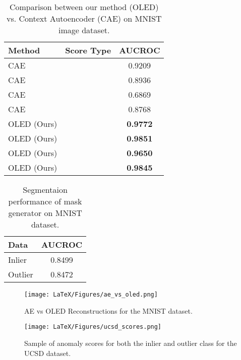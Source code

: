 \documentclass[10pt,twocolumn,letterpaper]{article}
\begin{document}
\begin{table}
\begin{center}
 \begin{tabular}{|l|l|c|} 
 \hline
Method & Score Type & AUCROC \\ [0.5ex] 
 \hline\hline
 CAE &   & 0.9209  \\ 
 CAE &   & 0.8936 \\
 CAE &   & 0.6869 \\
 CAE &   &  0.8768 \\
 \hline
 OLED (Ours) &   & \textbf{0.9772}  \\ 
 OLED (Ours) &   & \textbf{0.9851} \\
 OLED (Ours) &   & \textbf{0.9650} \\
 OLED (Ours) &   &  \textbf{0.9845} \\
 \hline
\end{tabular}
\end{center}
\caption{Comparison between our method (OLED) vs. Context Autoencoder (CAE) on MNIST image dataset.}
\label{oled_vs_cae}
\end{table}




\begin{table}
\begin{center}
 \begin{tabular}{|l|c|} 
 \hline
 Data  & AUCROC \\ [0.5ex] 
 \hline\hline
 Inlier & 0.8499  \\ 
 Outlier & 0.8472 \\
 \hline
\end{tabular}
\end{center}
\caption{Segmentaion performance of mask generator  on MNIST dataset.}
\label{segment_exp}
\end{table}

 \begin{figure}[t]
\begin{center}
\texttt{[image: LaTeX/Figures/ae\_vs\_oled.png]}
\end{center}
\caption{AE vs OLED Reconstructions for the MNIST dataset.}
\label{oled_ae}
\end{figure}

 \begin{figure}[t]
\begin{center}
\texttt{[image: LaTeX/Figures/ucsd\_scores.png]}
\end{center}
\caption{Sample of anomaly scores for both the inlier and outlier class for the UCSD dataset.}
\label{ucsd_scores}
\end{figure}
\end{document}
